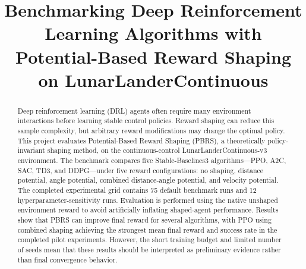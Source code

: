 \documentclass[conference,10pt]{IEEEtran}
\begin{document}
\title{Benchmarking Deep Reinforcement Learning Algorithms with\\
Potential-Based Reward Shaping on LunarLanderContinuous}

\author{%
  \and
  \and
  \and
}

\maketitle

\begin{abstract}
Deep reinforcement learning (DRL) agents often require many environment interactions before learning stable control policies. Reward shaping can reduce this sample complexity, but arbitrary reward modifications may change the optimal policy. This project evaluates Potential-Based Reward Shaping (PBRS), a theoretically policy-invariant shaping method, on the continuous-control LunarLanderContinuous-v3 environment. The benchmark compares five Stable-Baselines3 algorithms---PPO, A2C, SAC, TD3, and DDPG---under five reward configurations: no shaping, distance potential, angle potential, combined distance-angle potential, and velocity potential. The completed experimental grid contains 75 default benchmark runs and 12 hyperparameter-sensitivity runs. Evaluation is performed using the native unshaped environment reward to avoid artificially inflating shaped-agent performance. Results show that PBRS can improve final reward for several algorithms, with PPO using combined shaping achieving the strongest mean final reward and success rate in the completed pilot experiments. However, the short training budget and limited number of seeds mean that these results should be interpreted as preliminary evidence rather than final convergence behavior.
\end{abstract}
\end{document}
